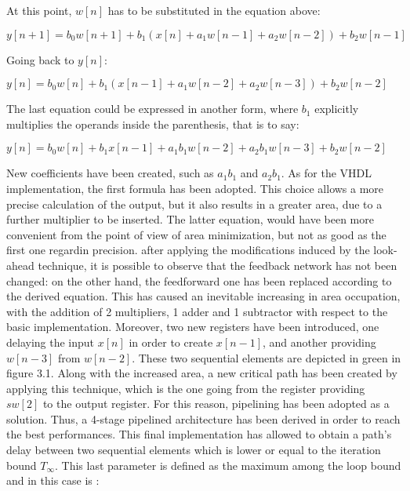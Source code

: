 At this point, $w[n]$ has to be substituted in the equation above:

\begin{center}
$y[n+1] = b_{0}w[n+1] + b_{1}(x[n] + a_{1}w[n-1] + a_{2}w[n-2]) + b_{2}w[n-1]$
\end{center}

Going back to $y[n]$: 

\begin{center}
$y[n] = b_{0}w[n] + b_{1}(x[n-1] + a_{1}w[n-2] + a_{2}w[n-3]) + b_{2}w[n-2]$
\end{center}

\bigskip
The last equation could be expressed in another form, where $b_{1}$ explicitly multiplies the operands inside the parenthesis, that is to say:

\begin{center}
$y[n] = b_{0}w[n] + b_{1}x[n-1] + a_{1}b_{1}w[n-2] + a_{2}b_{1}w[n-3] + b_{2}w[n-2]$
\end{center}

\bigskip
New coefficients have been created, such as $a_{1}b_{1}$ and $a_{2}b_{1}$. As for the VHDL implementation, the first formula has been adopted. This choice allows a more precise calculation of the output, but it also results in a greater area, due to a further multiplier to be inserted. The latter equation, would have been more convenient from the point of view of area minimization, but not as good as the first one regardin precision.
\newline
\newline
after applying the modifications induced by the look-ahead technique, it is possible to observe that the feedback network has not been changed: on the other hand, the feedforward one has been replaced according to the derived equation. This has caused an inevitable increasing in area occupation, with the addition of 2 multipliers, 1 adder and 1 subtractor with respect to the basic implementation. Moreover, two new registers have been introduced, one delaying the input $x[n]$ in order to create $x[n-1]$, and another providing $w[n-3]$ from $w[n-2]$. These two sequential elements are depicted in green in figure 3.1.
\newline
\newline
Along with the increased area, a new critical path has been created by applying this technique, which is the one going from the register providing $sw[2]$ to the output register. For this reason, pipelining has been adopted as a solution. Thus, a 4-stage pipelined architecture has been derived in order to reach the best performances. This final implementation has allowed to obtain a path's delay between two sequential elements which is lower or equal to the iteration bound $T_{\infty}$.
This last parameter is defined as the maximum among the loop bound and in this case is :


